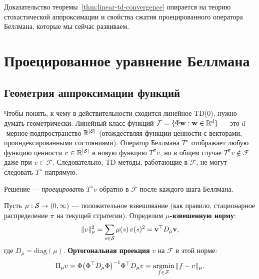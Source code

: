 Доказательство теоремы~\ref{thm:linear-td-convergence} опирается на теорию стохастической аппроксимации и свойства сжатия проецированного оператора Беллмана, которые мы сейчас развиваем.

\section{Проецированное уравнение Беллмана}
\label{sec:projected-bellman}

\subsection{Геометрия аппроксимации функций}

Чтобы понять, к чему в действительности сходится линейное TD(0), нужно думать геометрически.  Линейный класс функций $\mathcal{F} = \{\Phi \mathbf{w} : \mathbf{w} \in \mathbb{R}^d\}$ --- это $d$-мерное подпространство $\mathbb{R}^{|\mathcal{S}|}$ (отождествляя функции ценности с векторами, проиндексированными состояниями).  Оператор Беллмана $T^\pi$ отображает любую функцию ценности $v \in \mathbb{R}^{|\mathcal{S}|}$ в новую функцию $T^\pi v$, но в общем случае $T^\pi v \notin \mathcal{F}$ даже при $v \in \mathcal{F}$.  Следовательно, TD-методы, работающие в $\mathcal{F}$, не могут следовать $T^\pi$ напрямую.

Решение --- \emph{проецировать} $T^\pi v$ обратно в $\mathcal{F}$ после каждого шага Беллмана.

\begin{definition}
\label{def:mu-projection}
Пусть $\mu : \mathcal{S} \to (0, \infty)$ --- положительное взвешивание (как правило, стационарное распределение $\pi$ на текущей стратегии).  Определим \textbf{$\mu$-взвешенную норму}:
\begin{equation}
\label{eq:mu-norm}
\|v\|_\mu^2 = \sum_{s \in \mathcal{S}} \mu(s)\, v(s)^2 = \mathbf{v}^\top D_\mu \mathbf{v},
\end{equation}
где $D_\mu = \mathrm{diag}(\mu)$.  \textbf{Ортогональная проекция} $v$ на $\mathcal{F}$ в этой норме:
\begin{equation}
\label{eq:projection-def}
\Pi_\mu v = \Phi\bigl(\Phi^\top D_\mu \Phi\bigr)^{-1} \Phi^\top D_\mu v
= \operatorname*{argmin}_{f \in \mathcal{F}} \|f - v\|_\mu.
\end{equation}
\end{definition}

